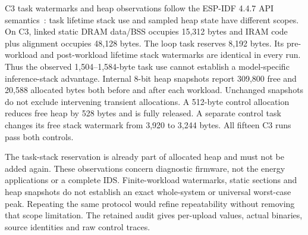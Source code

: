 C3 task watermarks and heap observations follow the ESP-IDF 4.4.7 API semantics~\cite{EspressifFreeRTOS447,EspressifHeap447}: task lifetime stack use and sampled heap state have different scopes. On C3, linked static DRAM data/BSS occupies 15,312 bytes and IRAM code plus alignment occupies 48,128 bytes. The loop task reserves 8,192 bytes. Its pre-workload and post-workload lifetime stack watermarks are identical in every run. Thus the observed 1,504--1,584-byte task use cannot establish a model-specific inference-stack advantage. Internal 8-bit heap snapshots report 309,800 free and 20,588 allocated bytes both before and after each workload. Unchanged snapshots do not exclude intervening transient allocations. A 512-byte control allocation reduces free heap by 528 bytes and is fully released. A separate control task changes its free stack watermark from 3,920 to 3,244 bytes. All fifteen C3 runs pass both controls.

The task-stack reservation is already part of allocated heap and must not be added again. These observations concern diagnostic firmware, not the energy applications or a complete IDS. Finite-workload watermarks, static sections and heap snapshots do not establish an exact whole-system or universal worst-case peak. Repeating the same protocol would refine repeatability without removing that scope limitation. The retained audit gives per-upload values, actual binaries, source identities and raw control traces.
